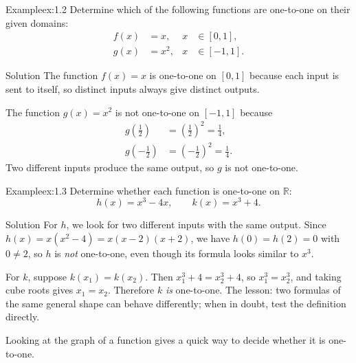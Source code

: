 \documentclass[a4paper,12pt,oneside]{memoir}
\begin{document}
\begin{workedexample}
\begin{envexample}{Example}{ex:1.2}{}
Determine which of the following functions are one-to-one on their given domains: \[ \begin{aligned} f(x) &= x, & x &\in [0, 1],\\ g(x) &= x^{2}, & x &\in [-1, 1]. \end{aligned} \]
\end{envexample}
\begin{envsolution}{Solution}{}{}
The function \(f(x) = x\) is one-to-one on \([0, 1]\) because each input is sent to itself, so distinct inputs always give distinct outputs.

The function \(g(x) = x^{2}\) is not one-to-one on \([-1, 1]\) because \[ \begin{aligned} g\!\left(\tfrac{1}{2}\right) &= \left(\tfrac{1}{2}\right)^{2} = \tfrac{1}{4},\\ g\!\left(-\tfrac{1}{2}\right) &= \left(-\tfrac{1}{2}\right)^{2} = \tfrac{1}{4}. \end{aligned} \] Two different inputs produce the same output, so \(g\) is not one-to-one.
\end{envsolution}
\end{workedexample}
\begin{workedexample}
\begin{envexample}{Example}{ex:1.3}{}
Determine whether each function is one-to-one on \(\mathbb{R}\): \[ h(x) = x^{3} - 4x, \qquad k(x) = x^{3} + 4. \]
\end{envexample}
\begin{envsolution}{Solution}{}{}
For \(h\), we look for two different inputs with the same output. Since \(h(x) = x(x^{2} - 4) = x(x - 2)(x + 2)\), we have \(h(0) = h(2) = 0\) with \(0 \neq 2\), so \(h\) is \emph{not} one-to-one, even though its formula looks similar to \(x^{3}\).

For \(k\), suppose \(k(x_{1}) = k(x_{2})\). Then \(x_{1}^{3} + 4 = x_{2}^{3} + 4\), so \(x_{1}^{3} = x_{2}^{3}\), and taking cube roots gives \(x_{1} = x_{2}\). Therefore \(k\) \emph{is} one-to-one. The lesson: two formulas of the same general shape can behave differently; when in doubt, test the definition directly.
\end{envsolution}
\end{workedexample}
Looking at the graph of a function gives a quick way to decide whether it is one-to-one.
\end{document}
